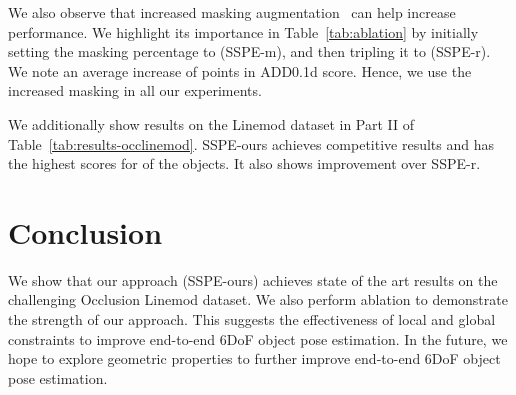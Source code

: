 \documentclass{article}
\begin{document}
We also observe that increased masking augmentation~\cite{zhong2020random} can help increase performance. We highlight its importance in Table~\ref{tab:ablation} by initially setting the masking percentage to  (SSPE-m), and then tripling it to  (SSPE-r). We note an average increase of  points in ADD0.1d score. Hence, we use the increased masking in all our experiments.

We additionally show results on the Linemod dataset in Part II of Table~\ref{tab:results-occlinemod}. SSPE-ours achieves competitive results and has the highest scores for  of the  objects. It also shows improvement over SSPE-r.

\section{Conclusion}

We show that our approach (SSPE-ours) achieves state of the art results on the challenging Occlusion Linemod dataset. We also perform ablation to demonstrate the strength of our approach. This suggests the effectiveness of local and global constraints to improve end-to-end 6DoF object pose estimation. In the future, we hope to explore geometric properties to further improve end-to-end 6DoF object pose estimation.



\end{document}
